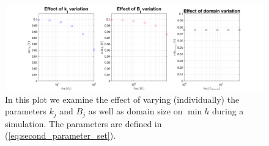 \documentclass{amsart}
\theoremstyle{definition}
\theoremstyle{remark}
\numberwithin{equation}{section}
\begin{document}
\begin{figure}
\centering
	\includegraphics[width=1.0\textwidth]{figures/fig_effect_on_minh_kj_Bj}	
	\caption{\label{fig:effect_Bj_kj_minh}  In this plot we
		examine the effect of varying (individually) the parameters $k_j$ and $B_j$ as well as domain size on $\min{h}$ during a simulation. The parameters are defined in (\ref{eq:second_parameter_set}). }
\end{figure}





\end{document}
